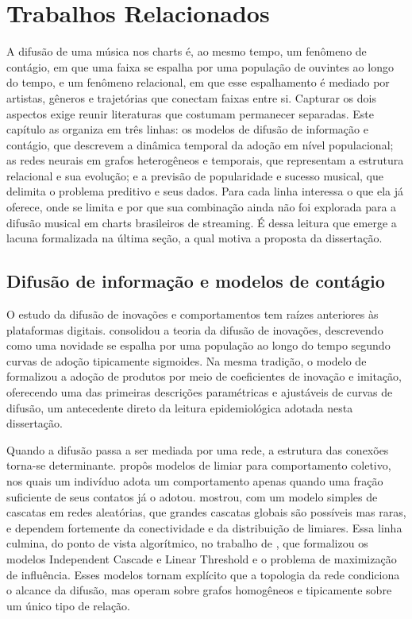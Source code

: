 \chapter{Trabalhos Relacionados}
\label{cap:trabalhos-relacionados}

A difusão de uma música nos charts é, ao mesmo tempo, um fenômeno de contágio, em que uma faixa se espalha por uma população de ouvintes ao longo do tempo, e um fenômeno relacional, em que esse espalhamento é mediado por artistas, gêneros e trajetórias que conectam faixas entre si. Capturar os dois aspectos exige reunir literaturas que costumam permanecer separadas. Este capítulo as organiza em três linhas: os modelos de difusão de informação e contágio, que descrevem a dinâmica temporal da adoção em nível populacional; as redes neurais em grafos heterogêneos e temporais, que representam a estrutura relacional e sua evolução; e a previsão de popularidade e sucesso musical, que delimita o problema preditivo e seus dados. Para cada linha interessa o que ela já oferece, onde se limita e por que sua combinação ainda não foi explorada para a difusão musical em charts brasileiros de streaming. É dessa leitura que emerge a lacuna formalizada na última seção, a qual motiva a proposta da dissertação.


\section{Difusão de informação e modelos de contágio}

O estudo da difusão de inovações e comportamentos tem raízes anteriores às plataformas digitais. \citet{rogers2003diffusion} consolidou a teoria da difusão de inovações, descrevendo como uma novidade se espalha por uma população ao longo do tempo segundo curvas de adoção tipicamente sigmoides. Na mesma tradição, o modelo de \citet{bass1969} formalizou a adoção de produtos por meio de coeficientes de inovação e imitação, oferecendo uma das primeiras descrições paramétricas e ajustáveis de curvas de difusão, um antecedente direto da leitura epidemiológica adotada nesta dissertação.

Quando a difusão passa a ser mediada por uma rede, a estrutura das conexões torna-se determinante. \citet{granovetter1978} propôs modelos de limiar para comportamento coletivo, nos quais um indivíduo adota um comportamento apenas quando uma fração suficiente de seus contatos já o adotou. \citet{watts2002cascades} mostrou, com um modelo simples de cascatas em redes aleatórias, que grandes cascatas globais são possíveis mas raras, e dependem fortemente da conectividade e da distribuição de limiares. Essa linha culmina, do ponto de vista algorítmico, no trabalho de \citet{kempe2003ic}, que formalizou os modelos Independent Cascade e Linear Threshold e o problema de maximização de influência. Esses modelos tornam explícito que a topologia da rede condiciona o alcance da difusão, mas operam sobre grafos homogêneos e tipicamente sobre um único tipo de relação.

